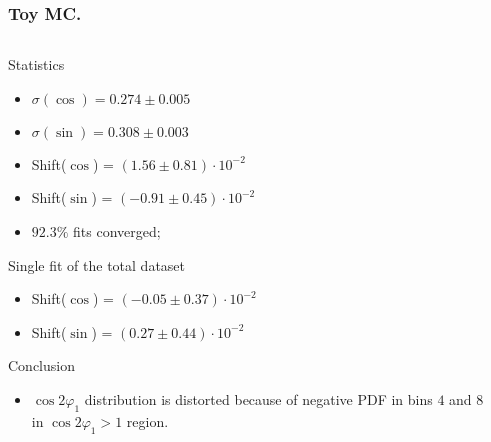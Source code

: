 \documentclass[10 pt,compress,mathserif]{beamer}
\newcommand{\cosbeta}{\ensuremath{\cos{2\varphi_1}}\xspace}
\begin{document}
\begin{frame}
 \frametitle{Toy MC.}
 \begin{small}
 \begin{columns}
  \begin{column}{0.5\textwidth}
  \begin{block}{Statistics}
  \begin{itemize}
   \item $\sigma(\cos) = 0.274\pm0.005$
   \item $\sigma(\sin) = 0.308\pm0.003$
   \item Shift($\cos$) = $(1.56\pm0.81)\cdot10^{-2}$
   \item Shift($\sin$) = $(-0.91\pm0.45)\cdot10^{-2}$
   \item $92.3\%$ fits converged;
  \end{itemize}
  \end{block}
  \begin{block}{Single fit of the total dataset}
   \begin{itemize}
    \item Shift($\cos$) = $(-0.05\pm0.37)\cdot10^{-2}$
    \item Shift($\sin$) = $(0.27\pm0.44)\cdot10^{-2}$
   \end{itemize}
  \end{block}
  \begin{block}{Conclusion}
  \begin{itemize}
   \item $\cosbeta$ distribution is distorted because of negative PDF in bins $4$ and $8$ in $\cos2\varphi_1>1$ region.
  \end{itemize}
  \end{block}
  \end{column}
  \begin{column}{0.5\textwidth}
    \begin{center}
    \end{center}
  \end{column}
 \end{columns}
 \end{small}
\end{frame}
\end{document}
